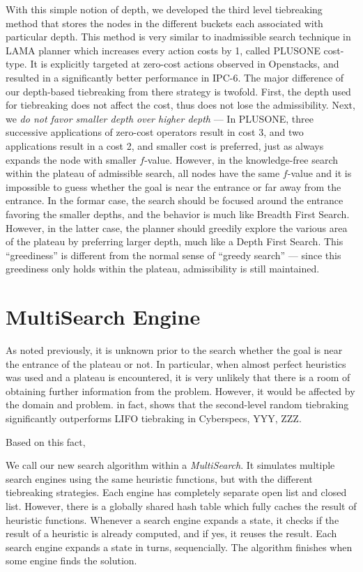 With this simple notion of depth, we developed the third level tiebreaking method that stores the nodes in the different buckets each associated with particular depth.  This method is very similar to inadmissible search technique in LAMA planner \cite{richter2010lama} which increases every action costs by 1, called PLUSONE cost-type.  It is explicitly targeted at zero-cost actions observed in Openstacks, and resulted in a significantly better performance in IPC-6.  The major difference of our depth-based tiebreaking from there strategy is twofold.  First, the depth used for tiebreaking does not affect the cost, thus does not lose the admissibility. Next, we \emph{do not favor smaller depth over higher depth} --- In PLUSONE, three successive applications of zero-cost operators result in cost 3, and two applications result in a cost 2, and smaller cost is preferred, just as \astar always expands the node with smaller $f$-value.  However, in the knowledge-free search within the plateau of admissible search, all nodes have the same $f$-value and it is impossible to guess whether the goal is near the entrance or far away from the entrance.  In the formar case, the search should be focused around the entrance favoring the smaller depths, and the behavior is much like Breadth First Search. However, in the latter case, the planner should greedily explore the various area of the plateau by preferring larger depth, much like a Depth First Search.
This ``greediness'' is different from the normal sense of ``greedy search'' --- since this greediness only holds within the plateau, admissibility is still maintained.

\section{MultiSearch Engine}

As noted previously, it is unknown prior to the search whether the goal is near the entrance of the plateau or not. In particular, when almost perfect heuristics was used and a plateau is encountered, it is very unlikely that there is a room of obtaining further information from the problem. 
% 
However, it would be affected by the domain and problem.
in fact,  shows that the second-level random tiebraking significantly outperforms LIFO tiebraking in Cyberspecs, YYY, ZZZ.

Based on this fact, 






We call our new search algorithm within \astar a \emph{MultiSearch}.
It simulates multiple search engines using the same heuristic functions,
but with the different tiebreaking strategies.  Each engine has completely
separate open list and closed list.  However, there is a
globally shared hash table which fully caches the result of heuristic
functions.  Whenever a search engine expands a state, it checks if the
result of a heuristic is already computed, and if yes, it reuses the
result.  Each search engine expands a state in turns, sequencially. The algorithm
finishes when some engine finds the solution.

